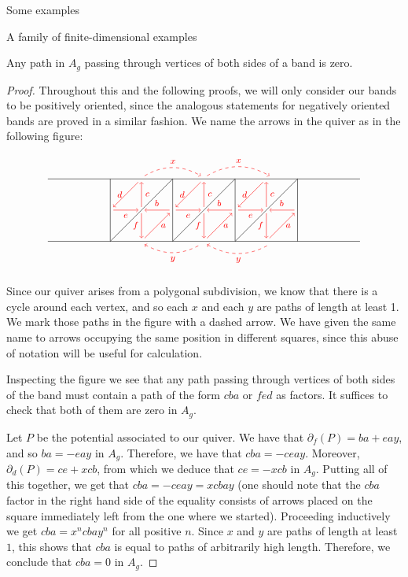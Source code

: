 \begin{chapter}{Some examples}
\begin{section}{A family of finite-dimensional examples}
\begin{lemma}\label{band-sides} Any path in $A_g$ passing through vertices of both sides of a band is zero.
\end{lemma}
\begin{proof} Throughout this and the following proofs, we will only consider our bands to be positively oriented, since the analogous statements for negatively oriented bands are proved in a similar fashion. We name the arrows in the quiver as in the following figure:

\[
\begin{tikzpicture}[text width=1.5mm, font=\footnotesize]
\draw (-5, 0) -- (5, 0);
\draw (-5, 2) -- (5, 2);
\foreach \x in {-3,-1,...,3}
\draw (\x, 0) -- (\x, 2);
\foreach \x in {-3,-1,1}
{
\draw (\x,0) -- (\x+2, 2);
\draw [->, red] (\x+1.9, 1) to node[above] {$b$} (\x+1.1, 1);
\draw[->, red] (\x+1, 0.9) to node[left]{$f$} (\x+1, 0.1);
\draw[->, red] (\x+1.1, 0.1) to node[right]{$a$} (\x+1.9, 0.9);
\draw[->, red] (\x+1, 1.1) to node[right]{$c$} (\x+1, 1.9);
\draw[->, red] (\x+0.9, 1.9) to node[left]{$d$} (\x+0.1, 1.1);
\draw[->, red] (\x+0.1, 1) to node[below]{$e$} (\x+0.9, 1);
}

\draw[->, red, dashed] (-1.9, 2.1) to [bend left] node[above]{$x$} (-0.1, 2.1);
\draw[->, red, dashed] (0.1, 2.1) to [bend left] node[above]{$x$} (2.1, 2.1);
\draw[<-, red, dashed] (-1.9, -0.1) to [bend right] node[below]{$y$} (-0.1, -0.1);
\draw[<-, red, dashed] (0.1, -0.1) to [bend right] node[below]{$y$} (2.1, -0.1);
\end{tikzpicture}
\]

Since our quiver arises from a polygonal subdivision, we know that there is a cycle around each vertex, and so each $x$ and each $y$ are paths of length at least 1. We mark those paths in the figure with a dashed arrow. We have given the same name to arrows occupying the same position in different squares, since this abuse of notation will be useful for calculation.

Inspecting the figure we see that any path passing through vertices of both sides of the band must contain a path of the form $cba$ or $fed$ as factors. It suffices to check that both of them are zero in $A_g$.

Let $P$ be the potential associated to our quiver. We have that $\partial_f(P) = ba + eay$, and so $ba  = -eay$ in $A_g$. Therefore, we have that $cba = -ceay$. Moreover, $\partial_d(P) = ce + xcb$, from which we deduce that $ce = -xcb$ in $A_g$. Putting all of this together, we get that $cba=-ceay=xcbay$ (one should note that the $cba$ factor in the right hand side of the equality consists of arrows placed on the square immediately left from the one where we started). Proceeding inductively we get $cba=x^ncbay^n$ for all positive $n$. Since $x$ and $y$ are paths of length at least $1$, this shows that $cba$ is equal to paths of arbitrarily high length. Therefore, we conclude that $cba=0$ in $A_g$. 


\end{proof}
\end{section}
\end{chapter}
